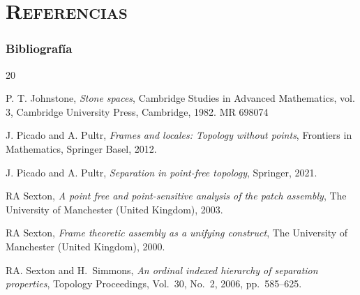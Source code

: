 \documentclass[compress,12pt]{beamer}
\begin{document}
\End

\section*{\textsc{Referencias}}
\begin{frame}[allowframebreaks]
\frametitle{Bibliografía}
\begin{thebibliography}{20}

 P. T. Johnstone, \textit{Stone spaces}, Cambridge Studies in Advanced Mathematics, vol. 3, Cambridge University Press, Cambridge, 1982. MR 698074



 J. Picado and A. Pultr, \textit{Frames and locales: Topology without points}, Frontiers in Mathematics, Springer Basel, 2012.

 J. Picado and A. Pultr, \textit{Separation in point-free topology}, Springer, 2021.

 RA Sexton, \textit{A point free and point-sensitive analysis of the patch assembly}, The University of Manchester (United Kingdom), 2003.

 RA Sexton, \textit{Frame theoretic assembly as a unifying construct}, The University of Manchester (United Kingdom), 2000.

 RA. Sexton and H.~Simmons, \textit{An ordinal indexed hierarchy of separation properties}, Topology Proceedings, Vol.~30, No.~2, 2006, pp.~585--625.




\end{thebibliography}
\end{frame}
\end{document}
